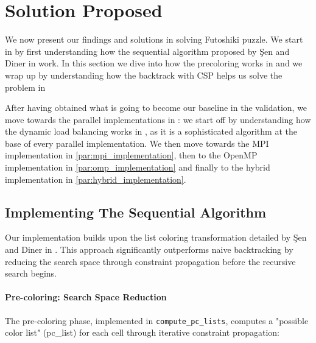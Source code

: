 \section{Solution Proposed}
\label{sec:solution}

We now present our findings and solutions in solving Futoshiki puzzle. We start in  by first understanding how the sequential algorithm proposed by Şen and Diner in \cite{Sen2024Futoshiki} work. In this section we dive into how the precoloring works in  and we wrap up by understanding how the backtrack with CSP helps us solve the problem in 

After having obtained what is going to become our baseline in the validation, we move towards the parallel implementations in : we start off by understanding how the dynamic load balancing works in , as it is a sophisticated algorithm at the base of every parallel implementation. We then move towards the MPI implementation in \cref{par:mpi_implementation}, then to the OpenMP implementation in \cref{par:omp_implementation} and finally to the hybrid implementation in \cref{par:hybrid_implementation}.

\subsection{Implementing The Sequential Algorithm}
\label{subsec:paper_implementation}
Our implementation builds upon the list coloring transformation detailed by Şen and Diner in \cite{Sen2024Futoshiki}. This approach significantly outperforms naive backtracking by reducing the search space through constraint propagation before the recursive search begins. 

\paragraph{Pre-coloring: Search Space Reduction}
\label{par:precoloring}
The pre-coloring phase, implemented in \texttt{compute\_pc\_lists}, computes a "possible color list" (pc\_list) for each cell through iterative constraint propagation:

